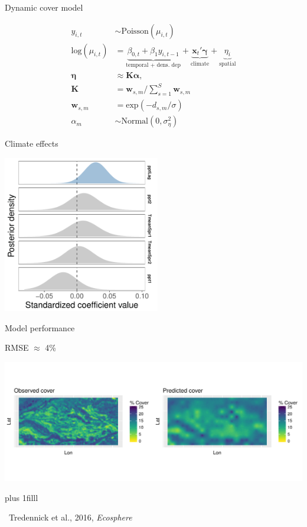 \documentclass[14pt, compress, aspectratio=1610]{beamer}
\newcommand{\btVFill}{\vskip0pt plus 1filll}
\newcommand{\credit}[1]{\btVFill\par\hfill \footnotesize ~#1}
\begin{document}
\begin{frame}{%
\protect\hypertarget{dynamic-cover-model-1}{%
Dynamic cover model}}

\small

\begin{align*}
y_{i,t} &\sim \text{Poisson}(\mu_{i,t}) \\
\text{log}(\mu_{i,t}) &= \underbrace{\beta_{0,t} + \beta_{1}y_{i,t-1}}_\text{temporal + dens. dep} + \underbrace{\textbf{x}_{t}'\boldsymbol{\gamma}}_\text{climate} + \underbrace{\eta_{i}}_\text{spatial} \\
\boldsymbol{\eta} &\approx \textbf{K}\boldsymbol{\alpha}, \\
\textbf{K} &= \mathbf{w}_{s,m} / \sum_{s=1}^S \mathbf{w}_{s,m} \\
\mathbf{w}_{s,m} &= \text{exp}\left(-d_{s,m} / \sigma \right) \\
\alpha_{m} &\sim \text{Normal}(0,\sigma_{\eta}^2)
\end{align*}

\end{frame}

\begin{frame}{%
\protect\hypertarget{climate-effects}{%
Climate effects}}

\centering

\includegraphics[height=2.7in]{./figures/post_climate_covariates.pdf}

\end{frame}

\begin{frame}{%
\protect\hypertarget{model-performance}{%
Model performance}}

\small{RMSE $\approx$ 4\%}

\includegraphics[width=\textwidth]{./figures/obs_predict_spatial_pres.pdf}

\credit{Tredennick et al., 2016, \emph{Ecosphere}}

\end{frame}
\end{document}
